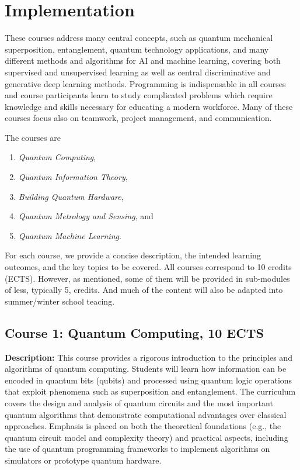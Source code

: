 \documentclass{scrreprt}
\begin{document}
\section{Implementation}

These courses address many central concepts, such as quantum
mechanical superposition, entanglement, quantum technology applications, and many
different methods and algorithms for AI and machine learning, covering
both supervised and unsupervised learning as well as central
discriminative and generative deep learning methods. Programming is
indispensable in all courses and course participants learn to
study complicated problems which require knowledge and skills
necessary for educating a modern workforce. Many of these courses
focus also on teamwork, project management, and communication.

The courses are
\begin{enumerate}
\item \textit{Quantum Computing},
\item \textit{Quantum Information Theory},
\item \textit{Building Quantum Hardware},
\item \textit{Quantum Metrology and Sensing}, and
\item \textit{Quantum Machine Learning}.
\end{enumerate}

For each course, we provide a concise description, the intended learning outcomes, and the key topics to be covered.
All courses correspond to 10 credits (ECTS). However, as mentioned, some of them will be provided in sub-modules of less, typically 5, credits. And much of the content will also be adapted into summer/winter school teacing.

\subsection{Course 1: Quantum Computing, 10 ECTS}

\textbf{Description:} This course provides a rigorous introduction to the principles and algorithms of quantum computing. Students will learn how information can be encoded in quantum bits (qubits) and processed using quantum logic operations that exploit phenomena such as superposition and entanglement. The curriculum covers the design and analysis of quantum circuits and the most important quantum algorithms that demonstrate computational advantages over classical approaches. Emphasis is placed on both the theoretical foundations (e.g., the quantum circuit model and complexity theory) and practical aspects, including the use of quantum programming frameworks to implement algorithms on simulators or prototype quantum hardware.
\end{document}
